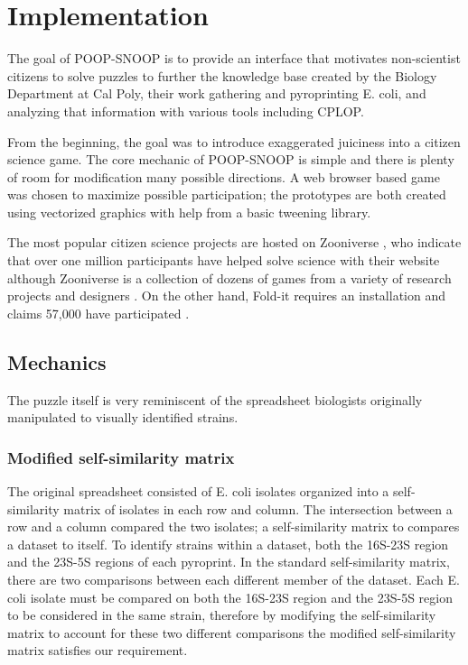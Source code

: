 \chapter{Implementation}

The goal of POOP-SNOOP is to provide an interface that motivates non-scientist citizens to solve puzzles to further the knowledge base created by the Biology Department at Cal Poly, their work gathering and pyroprinting E. coli, and analyzing that information with various tools including CPLOP. 

From the beginning, the goal was to introduce exaggerated juiciness into a citizen science game. The core mechanic of POOP-SNOOP is simple and there is plenty of room for modification many possible directions. A web browser based game was chosen to maximize possible participation; the prototypes are both created using vectorized graphics with help from a basic tweening library. 

The most popular citizen science projects are hosted on Zooniverse \cite{borne2011zooniverse}, who indicate that over one million participants have helped solve science with their website although Zooniverse is a collection of dozens of games from a variety of research projects and designers \cite{borne2011zooniverse}. On the other hand, Fold-it requires an installation and claims 57,000 have participated \cite{cooper2010challenge}.

\section{Mechanics} 

The puzzle itself is very reminiscent of the spreadsheet biologists originally manipulated to visually identified strains.

\subsection{Modified self-similarity matrix}

The original spreadsheet consisted of E. coli isolates organized into a self-similarity matrix of isolates in each row and column. The intersection between a row and a column compared the two isolates; a self-similarity matrix to compares a dataset to itself. To identify strains within a dataset, both the 16S-23S region and the 23S-5S regions of each pyroprint. In the standard self-similarity matrix, there are two comparisons between each different member of the dataset. Each E. coli isolate must be compared on both the 16S-23S region and the 23S-5S region to be considered in the same strain, therefore by modifying the self-similarity matrix to account for these two different comparisons the modified self-similarity matrix satisfies our requirement.

